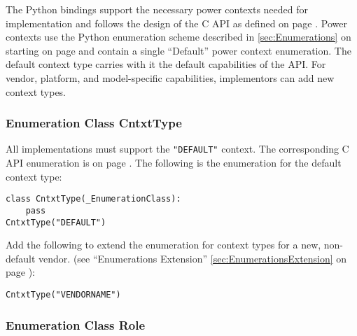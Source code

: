 \documentclass[12pt]{report} %
\begin{document}
\begin{appendices}
The Python bindings support the necessary power contexts needed for 
implementation and follows the design of the C API as defined on page
\pageref{sec:ContextTypeDefinitions}. Power contexts use the Python
enumeration scheme described in \ref{sec:Enumerations} on starting on page
\pageref{sec:Enumerations} and contain a single ``Default'' power context
enumeration. The default context type carries with it the default capabilities
of the API. For vendor, platform, and model-specific capabilities, implementors can add new context types.

\subsubsection{Enumeration Class CntxtType}\label{class:CntxtType}

All implementations must support the \texttt{"DEFAULT"} context. The corresponding C
API enumeration is on page \pageref{type:CntxtType}. The following is the enumeration
for the default context type:

\begin{center}\begin{minipage}{.95\linewidth}\begin{lstlisting}
class CntxtType(_EnumerationClass):
    pass
CntxtType("DEFAULT")
\end{lstlisting}\end{minipage}\end{center}

Add the following to extend the enumeration for context types for a new, non-default vendor.
(see ``Enumerations Extension'' \ref{sec:EnumerationsExtension} on page
\pageref{sec:EnumerationsExtension}):

\begin{center}\begin{minipage}{.95\linewidth}\begin{lstlisting}
CntxtType("VENDORNAME")
\end{lstlisting}\end{minipage}\end{center}

\subsubsection{Enumeration Class Role}\label{class:Role}


\end{appendices}
\end{document}

